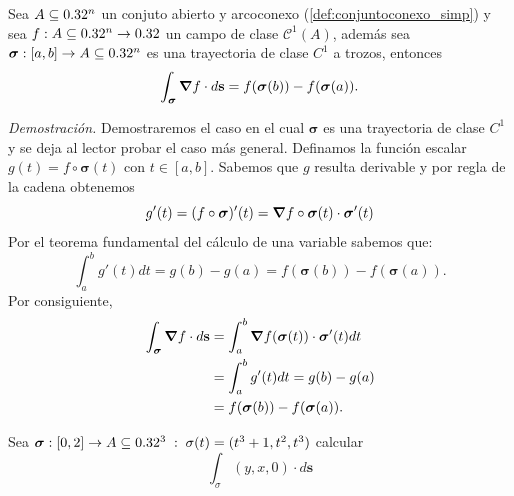 \begin{theorem} \label{thm:t1}

    Sea $A\subseteq0.32^n$ un conjuto abierto y arcoconexo (\ref{def:conjuntoconexo_simp})   y  sea $f:A\subseteq0.32^n\to0.32$ un campo de clase $\mathcal{C}^1(A)$, adem\'as sea $\boldsymbol{\sigma}:[a,b]\to A\subseteq0.32^n$ es una trayectoria de clase $C^{1}$ a trozos,  entonces   
    \[
       \int_{\boldsymbol{\sigma}}\grad f\cdot d\mathbf{s}=f(\boldsymbol{\sigma}(b))-f(\boldsymbol{\sigma}(a)).
    \]    


    \textit{Demostración.} Demostraremos el caso en el cual $\boldsymbol{\sigma}$   es una trayectoria de clase $C^{1}$ y se deja al lector probar el caso m\'as general.   Definamos la funci\'on escalar $g(t)=f \circ \boldsymbol{\sigma}(t)$ con $t \in [a,b].$ Sabemos que $g$ resulta derivable  y por regla de la cadena obtenemos
    \begin{equation*}
        g'(t)=(f\circ\boldsymbol{\sigma})'(t)=\grad{f } \circ \boldsymbol{\sigma}(t)\cdot\boldsymbol{\sigma}'(t)
    \end{equation*}
   Por el teorema fundamental del cálculo de una variable sabemos que:
    \begin{equation*}
        \int_{a}^{b}g'(t)dt=g(b)-g(a)=f(\boldsymbol{\sigma}(b))-f(\boldsymbol{\sigma}(a)).
    \end{equation*}
    Por consiguiente,
    \begin{align*}
        \int_{\boldsymbol{\sigma}}\grad f\cdot d\mathbf{s}&=\int_{a}^{b}\grad{f(\boldsymbol{\sigma}(t))}\cdot\boldsymbol{\sigma}'(t)dt\\
        &=\int_{a}^{b}g'(t)dt=g(b)-g(a)\\
        &=f(\boldsymbol{\sigma}(b))-f(\boldsymbol{\sigma}(a)).
    \end{align*}
\end{theorem}

\begin{tarea} Sea  $\boldsymbol{\sigma}:[0,2]\to A\subseteq0.32^3\; : \; \sigma(t) = (t^{3}+1, t^{2}, t^{3})$  calcular  $$ \int_{\sigma}  (y, x, 0)  \cdot d\mathbf{s} $$
\end{tarea}


